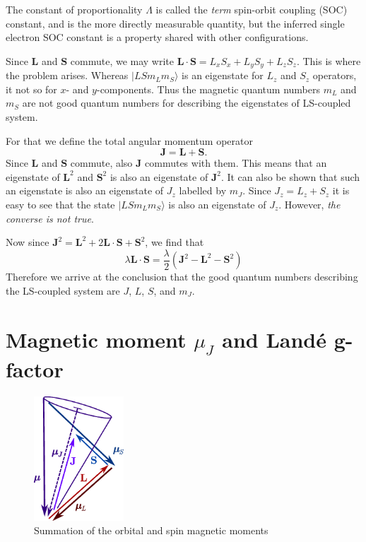 The constant of proportionality $\Lambda$ is called the \textit{term} spin-orbit coupling (SOC) constant, and is the more directly measurable quantity, but the inferred single electron SOC constant is a property shared with other configurations.

Since $\mathbf{L}$ and $\mathbf{S}$ commute, we may write $\mathbf{L} \cdot \mathbf{S} = L_x S_x + L_y S_y + L_z S_z$. This is where the problem arises. Whereas $|LSm_Lm_S\rangle$ is an eigenstate for $L_z$ and $S_z$ operators, it not so for $x$- and $y$-components. Thus the magnetic quantum numbers $m_L$ and $m_S$ are not good quantum numbers for describing the eigenstates of LS-coupled system.

For that we define the total angular momentum operator 
\begin{equation}
\mathbf{J} = \mathbf{L} + \mathbf{S}.
\end{equation}
Since $\mathbf{L}$ and  $\mathbf{S}$ commute, also $\mathbf{J}$ commutes with them. This means that an eigenstate of $\mathbf{L}^2$ and $\mathbf{S}^2$ is also an eigenstate of $\mathbf{J}^2$. It can also be shown that such an eigenstate is also an eigenstate of $J_z$ labelled by $m_J$. Since $J_z = L_z + S_z$ it is easy to see that the state $|LSm_Lm_S\rangle$ is also an eigenstate of $J_z$. However, \emph{the converse is not true}.

Now since $\mathbf{J}^2 = \mathbf{L}^2 + 2\mathbf{L} \cdot \mathbf{S} + \mathbf{S}^2$, we find that
\begin{equation}
\lambda \mathbf{L} \cdot \mathbf{S} = \frac{\lambda}{2}(\mathbf{J}^2-\mathbf{L}^2-\mathbf{S}^2 )
\end{equation}
Therefore we arrive at the conclusion that the good quantum numbers describing the LS-coupled system are $J$, $L$, $S$, and $m_J$.

\section{Magnetic moment $\mu_J$ and Land\'{e} g-factor}

\begin{figure}[h!]
\centering
\includegraphics[width=0.3\textwidth]{magnetism/figures/mu_J}
\caption{Summation of the orbital and spin magnetic moments\label{fig:mu_J}}
\end{figure}


